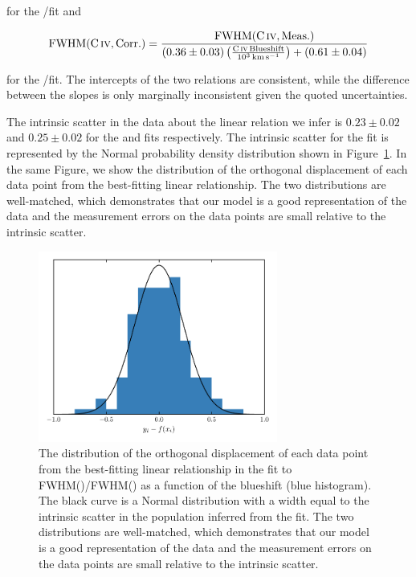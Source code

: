 \noindent for the /\ha fit and 

\begingroup\makeatletter{}\check@mathfonts
\begin{eqnarray}
    \label{eq:hbfwhm}
    \text{FWHM}(\text{C}\,\textsc{iv}, \text{Corr.}) = \frac{\text{FWHM}(\text{C}\,\textsc{iv}, \text{Meas.})}{ (0.36\pm0.03) \left(\frac{\text{C}\,\textsc{iv}\, \text{Blueshift}}{10^3 \,\text{km}\,\text{s}^{-1}} \right) + (0.61\pm0.04)}
\end{eqnarray}
\endgroup

\noindent for the /\hb fit. 
The intercepts of the two relations are consistent, while the difference between the slopes is only marginally inconsistent given the quoted uncertainties. 

The intrinsic scatter in the data about the linear relation we infer is $0.23 \pm 0.02$ and $0.25 \pm 0.02$ for the \ha and \hb fits respectively. 
The intrinsic scatter for the \ha fit is represented by the Normal probability density distribution shown in Figure~\ref{fig:intrinsic_scatter}. 
In the same Figure, we show the distribution of the orthogonal displacement of each data point from the best-fitting linear relationship. 
The two distributions are well-matched, which demonstrates that our model is a good representation of the data and the measurement errors on the data points are small relative to the intrinsic scatter.    

\begin{figure}[t!]
    \centering 
    \includegraphics[width=0.7\textwidth]{figures/chapter03/intrinsic_scatter.pdf} 
    \caption[{The distribution of the orthogonal displacement of each data point from the best-fitting linear relationship in the fit to FWHM()/FWHM(\hans) as a function of the  blueshift.}]{The distribution of the orthogonal displacement of each data point from the best-fitting linear relationship in the fit to FWHM()/FWHM(\hans) as a function of the  blueshift (blue histogram). The black curve is a Normal distribution with a width equal to the intrinsic scatter in the population inferred from the fit. The two distributions are well-matched, which demonstrates that our model is a good representation of the data and the measurement errors on the data points are small relative to the intrinsic scatter.} 
    \label{fig:intrinsic_scatter}
\end{figure}

